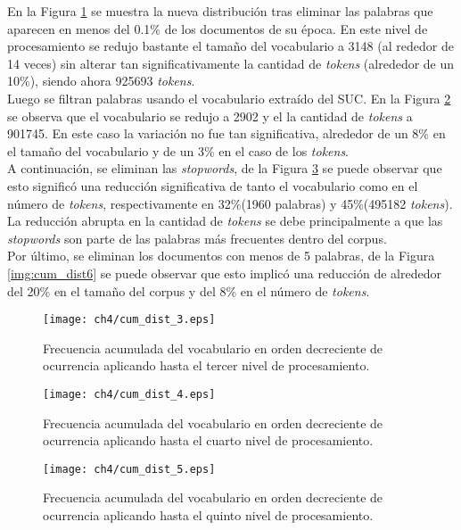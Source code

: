 En la Figura \ref{img:cum_dist3} se muestra la nueva distribución tras eliminar las palabras que aparecen en menos del 0.1\% de los documentos de su época. En este nivel de procesamiento se redujo bastante el tamaño del vocabulario a 3148 (al rededor de 14 veces) sin alterar tan significativamente la cantidad de \textit{tokens} (alrededor de un 10\%), siendo ahora 925693 \textit{tokens}.\\

Luego se filtran palabras usando el vocabulario extraído del SUC. En la Figura \ref{img:cum_dist4} se observa que el vocabulario se redujo a 2902 y el la cantidad de \textit{tokens} a 901745. En este caso la variación no fue tan significativa, alrededor de un 8\% en el tamaño del vocabulario y de un 3\% en el caso de los \textit{tokens}.\\

A continuación, se eliminan las \textit{stopwords}, de la Figura \ref{img:cum_dist5} se puede observar que esto significó una reducción significativa de tanto el vocabulario como en el número de \textit{tokens}, respectivamente en 32\%(1960 palabras) y 45\%(495182 \textit{tokens}). La reducción abrupta en la cantidad de \textit{tokens} se debe principalmente a que las \textit{stopwords} son parte de las palabras más frecuentes dentro del corpus.\\

Por último, se eliminan los documentos con menos de 5 palabras, de la Figura \ref{img:cum_dist6} se puede observar que esto implicó una reducción de alrededor del 20\% en el tamaño del corpus y del 8\% en el número de \textit{tokens}.

\begin{figure}
    \centering
    \texttt{[image: ch4/cum\_dist\_3.eps]}
    \caption{Frecuencia acumulada del vocabulario en orden decreciente de ocurrencia aplicando hasta el tercer nivel de procesamiento.}
    \label{img:cum_dist3}
\end{figure}

\begin{figure}
    \centering
    \texttt{[image: ch4/cum\_dist\_4.eps]}
    \caption{Frecuencia acumulada del vocabulario en orden decreciente de ocurrencia aplicando hasta el cuarto nivel de procesamiento.}
    \label{img:cum_dist4}
\end{figure}

\begin{figure}
    \centering
    \texttt{[image: ch4/cum\_dist\_5.eps]}
    \caption{Frecuencia acumulada del vocabulario en orden decreciente de ocurrencia aplicando hasta el quinto nivel de procesamiento.}
    \label{img:cum_dist5}
\end{figure}

